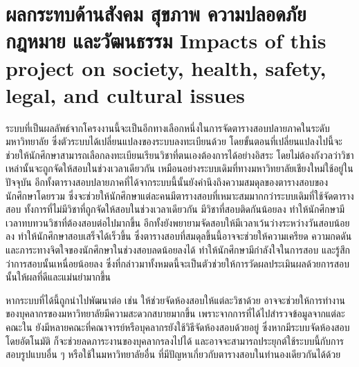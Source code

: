 \section{\ifcpe%
ผลกระทบด้านสังคม สุขภาพ ความปลอดภัย กฎหมาย และวัฒนธรรม
\else%
Impacts of this project on society, health, safety, legal, and cultural issues
\fi}

ระบบที่เป็นผลลัพธ์จากโครงงานนี้จะเป็นอีกทางเลือกหนึ่งในการจัดตารางสอบปลายภาคในระดับมหาวิทยาลัย
ซึ่งตัวระบบได้เปลี่ยนแปลงของระบบลงทะเบียนด้วย โดยขั้นตอนที่เปลี่ยนแปลงไปนี้จะช่วยให้นักศึกษาสามารถเลือกลงทะเบียนเรียนวิชาที่ตนเองต้องการได้อย่างอิสระ 
โดยไม่ต้องกังวลว่าวิชาเหล่านั้นจะถูกจัดให้สอบในช่วงเวลาเดียวกัน เหมือนอย่างระบบเดิมที่ทางมหาวิทยาลัยเชียงใหม่ใช้อยู่ในปัจจุบัน
อีกทั้งตารางสอบปลายภาคที่ได้จากระบบนี้นั้นยังคำนึงถึงความสมดุลของตารางสอบของนักศึกษาโดยรวม ซึ่งจะช่วยให้นักศึกษาแต่ละคนมีตารางสอบที่เหมาะสมมากกว่าระบบเดิมที่ใช้จัดตารางสอบ
ทั้งการที่ไม่มีวิชาที่ถูกจัดให้สอบในช่วงเวลาเดียวกัน มีวิชาที่สอบติดกันน้อยลง ทำให้นักศึกษามีเวลาทบทวนวิชาที่ต้องสอบต่อไปมากขึ้น อีกทั้งยังพยายามจัดสอบให้มีเวลาเว้นว่างระหว่างวันสอบน้อยลง
ทำให้นักศึกษาสอบเสร็จได้เร็วขึ้น ซึ่งตารางสอบที่สมดุลขึ้นนี้อาจจะช่วยให้ความเครียด ความกดดัน และภาระทางจิตใจของนักศึกษาในช่วงสอบลดน้อยลงได้ ทำให้นักศึกษามีกำลังใจในการสอบ และรู้สึกว่าการสอบนั้นเหนื่อยน้อยลง
ซึ่งที่กล่าวมาทั้งหมดนี้จะเป็นตัวช่วยให้การวัดผลประเมินผลด้วยการสอบนั้นให้ผลที่ดีและแม่นยำมากขึ้น


หากระบบที่ได้นี้ถูกนำไปพัฒนาต่อ เช่น ให้ช่วยจัดห้องสอบให้แต่ละวิชาด้วย อาจจะช่วยให้การทำงานของบุคลากรของมหาวิทยาลัยมีความสะดวกสบายมากขึ้น 
เพราะจากการที่ได้ไปสำรวจข้อมูลจากแต่ละคณะใน ยังมีหลายคณะที่คณาจารย์หรือบุคลากรยังใช้วิธีจัดห้องสอบด้วยอยู่ 
ซึ่งหากมีระบบจัดห้องสอบโดยอัตโนมัติ ก็จะช่วยลดภาระงานของบุคลากรลงไปได้ และอาจจะสามารถประยุกต์ใช้ระบบนี้กับการสอบรูปแบบอื่น ๆ หรือใช้ในมหาวิทยาลัยอื่น ที่มีปัญหาเกี่ยวกับตารางสอบในทำนองเดียวกันได้ด้วย
